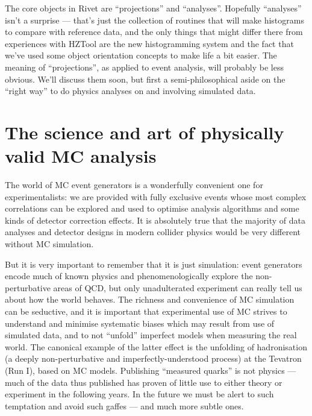 \documentclass{JHEP3}
\begin{document}
The core objects in Rivet are ``projections'' and ``analyses''. Hopefully
``analyses'' isn't a surprise --- that's just the collection of routines that
will make histograms to compare with reference data, and the only things that
might differ there from experiences with HZTool\cite{Bromley:1995np} are the new histogramming system
and the fact that we've used some object orientation concepts to make life a bit
easier. The meaning of ``projections'', as applied to event analysis, will
probably be less obvious. We'll discuss them soon, but first a
semi-philosophical aside on the ``right way'' to do physics analyses on and
involving simulated data.


\section{The science and art of physically valid MC analysis}

The world of MC event generators is a wonderfully convenient one for
experimentalists: we are provided with fully exclusive events whose most complex
correlations can be explored and used to optimise analysis algorithms and some
kinds of detector correction effects. It is absolutely true that the majority of
data analyses and detector designs in modern collider physics would be very
different without MC simulation.

But it is very important to remember that it is just simulation: event
generators encode much of known physics and phenomenologically explore the
non-perturbative areas of QCD, but only unadulterated experiment can really tell
us about how the world behaves. The richness and convenience of MC simulation
can be seductive, and it is important that experimental use of MC strives to
understand and minimise systematic biases which may result from use of simulated
data, and to not ``unfold'' imperfect models when measuring the real world. The
canonical example of the latter effect is the unfolding of hadronisation (a
deeply non-perturbative and imperfectly-understood process) at the Tevatron (Run
I), based on MC models. Publishing ``measured quarks'' is not physics --- much
of the data thus published has proven of little use to either theory or
experiment in the following years. In the future we must be alert to such
temptation and avoid such gaffes --- and much more subtle ones.
\end{document}

